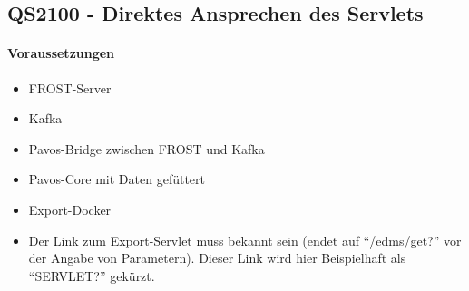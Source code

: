 \subsection{QS2100 - Direktes Ansprechen des Servlets}
\paragraph{Voraussetzungen}
\begin{itemize}
\item FROST-Server
\item Kafka
\item Pavos-Bridge zwischen FROST und Kafka
\item Pavos-Core mit Daten gefüttert
\item Export-Docker
\item Der Link zum Export-Servlet muss bekannt sein (endet auf ``/edms/get?'' vor der Angabe von Parametern). Dieser Link wird hier Beispielhaft als ``SERVLET?'' gekürzt.
\end{itemize}
